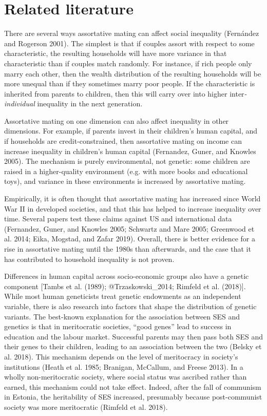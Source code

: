 \documentclass[
]{article}
\begin{document}
\hypertarget{related-literature}{%
\section{Related literature}\label{related-literature}}

There are several ways assortative mating can affect social inequality
(Fernández and Rogerson 2001). The simplest is that if couples assort with
respect to some characteristic, the resulting households will have more
variance in that characteristic than if couples match randomly. For
instance, if rich people only marry each other, then the wealth
distribution of the resulting households will be more unequal than if
they sometimes marry poor people. If the characteristic is inherited
from parents to children, then this will carry over into higher
inter\emph{-individual} inequality in the next generation.

Assortative mating on one dimension can also affect inequality in other
dimensions. For example, if parents invest in their children's human
capital, and if households are credit-constrained, then assortative
mating on income can increase inequality in children's human capital
(Fernandez, Guner, and Knowles 2005). The mechanism is purely environmental, not
genetic: some children are raised in a higher-quality environment (e.g.
with more books and educational toys), and variance in these
environments is increased by assortative mating.

Empirically, it is often thought that assortative mating has increased
since World War II in developed societies, and that this has helped to
increase inequality over time. Several papers test these claims against
US and international data (Fernandez, Guner, and Knowles 2005; Schwartz and Mare 2005; Greenwood et al. 2014; Eika, Mogstad, and Zafar 2019). Overall, there is better
evidence for a rise in assortative mating until the 1980s than
afterwards, and the case that it has contributed to household inequality
is not proven.

Differences in human capital across socio-economic groups also have a
genetic component {[}Tambs et al. (1989); @Trzaskowski\_2014; Rimfeld et al. (2018){]}.
While most human geneticists treat genetic endowments as an independent
variable, there is also research into factors that shape the
distribution of genetic variants. The best-known explanation for the
association between SES and genetics is that in meritocratic societies,
``good genes'' lead to success in education and the labour market.
Successful parents may then pass both SES and their genes to their
children, leading to an association between the two
(Belsky et al. 2018). This mechanism depends on the level of meritocracy
in society's institutions (Heath et al. 1985; Branigan, McCallum, and Freese 2013). In a
wholly non-meritocratic society, where social status was ascribed rather
than earned, this mechanism could not take effect. Indeed, after the
fall of communism in Estonia, the heritability of SES increased,
presumably because post-communist society was more meritocratic
(Rimfeld et al. 2018).
\end{document}

